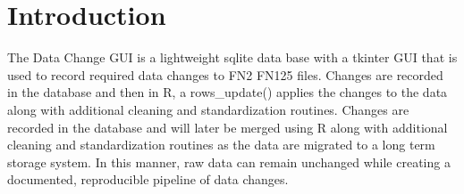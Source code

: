 \documentclass[
]{book}
\begin{document}
\hypertarget{introduction-1}{%
\section{Introduction}\label{introduction-1}}

The Data Change GUI is a lightweight sqlite data base with a tkinter GUI that is used to record required data changes to FN2 FN125 files. Changes are recorded in the database and then in R, a rows\_update() applies the changes to the data along with additional cleaning and standardization routines. Changes are recorded in the database and will later be merged using R along with additional cleaning and standardization routines as the data are migrated to a long term storage system. In this manner, raw data can remain unchanged while creating a documented, reproducible pipeline of data changes.
\end{document}
